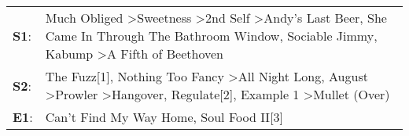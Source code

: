 \begin{supertabular}{p{0.03\textwidth}p{0.92\textwidth}}
 \textbf{S1}:  &   Much Obliged\textsuperscript{} \textgreater \enspace Sweetness\textsuperscript{} \textgreater \enspace 2nd Self\textsuperscript{} \textgreater \enspace Andy's Last Beer\textsuperscript{}, \enspace She Came In Through The Bathroom Window\textsuperscript{}, \enspace Sociable Jimmy\textsuperscript{}, \enspace Kabump\textsuperscript{} \textgreater \enspace A Fifth of Beethoven\textsuperscript{}  \enspace  \\
 \textbf{S2}:  &  The Fuzz[1]\textsuperscript{}, \enspace Nothing Too Fancy\textsuperscript{} \textgreater \enspace All Night Long\textsuperscript{}, \enspace August\textsuperscript{} \textgreater \enspace Prowler\textsuperscript{} \textgreater \enspace Hangover\textsuperscript{}, \enspace Regulate[2]\textsuperscript{}, \enspace Example 1\textsuperscript{} \textgreater \enspace Mullet (Over)\textsuperscript{}  \enspace  \\
 \textbf{E1}:  &                                                                                                                                                                                                                                                                                                                        Can't Find My Way Home\textsuperscript{}, \enspace Soul Food II[3]\textsuperscript{}  \enspace  \\
\end{supertabular}
